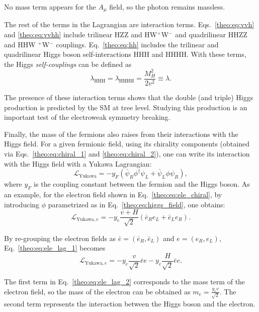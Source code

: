 \documentclass[../main.tex]{subfiles}
\begin{document}
No mass term appears for the $A_\mu$ field, so the photon remains massless.

The rest of the terms in the Lagrangian are interaction terms. Eqs.~\eqref{theo:eq:vvh} and \eqref{theo:eq:vvhh} include trilinear HZZ and HW${}^+$W${}^-$ and quadrilinear HHZZ and HHW
${}^+$W${}^-$ couplings. Eq.~\eqref{theo:eq:hh} includes the trilinear and quadrilinear Higgs boson self-interactions HHH and HHHH. With these terms, the Higgs \textit{self-couplings} can be defined as
\begin{equation}
\lambda_{\text{HHH}} = \lambda_{\text{HHHH}} = \frac{M_H^2}{2v^2} \equiv \lambda.
\end{equation}

The presence of these interaction terms shows that the double (and triple) Higgs production is predicted by the SM at tree level. Studying this production is an important test of the electroweak symmetry breaking.

Finally, the mass of the fermions also raises from their interactions with the Higgs field. For a given fermionic field, using its chirality components (obtained via Eqs.~\eqref{theo:eq:chiral_1} and \eqref{theo:eq:chiral_2}), one can write its interaction with the Higgs field with a Yukawa Lagrangian:
\begin{equation}
\mathcal{L}_{\text{Yukawa}} = -y_F(\bar{\psi}_R\phi^\dagger\psi_L + \bar{\psi}_L\phi\psi_R),
\end{equation}
where $y_F$ is the coupling constant between the fermion and the Higgs boson. As an example, for the electron field shown in Eq.~\eqref{theo:eq:ele_chiral}, by introducing $\phi$ parametrized as in Eq.~\eqref{theo:eq:higgs_field}, one obtains:
\begin{equation}
\label{theo:eq:ele_lag_1}
\mathcal{L}_{\text{Yukawa}, e} = -y_e \frac{v + H}{\sqrt{2}}(\bar{e}_R e_L + \bar{e}_L e_R).
\end{equation}

By re-grouping the electron fields as $\bar{e} = (\bar{e}_R,\bar{e}_L)$ and $e = (e_R, e_L)$, Eq.~\eqref{theo:eq:ele_lag_1} becomes
\begin{equation}
\label{theo:eq:ele_lag_2}
\mathcal{L}_{\text{Yukawa}, e} = -y_e \frac{v}{\sqrt{2}} \bar{e}e -y_e \frac{H}{\sqrt{2}} \bar{e}e.
\end{equation}

The first term in Eq.~\eqref{theo:eq:ele_lag_2} corresponds to the mass term of the electron field, so the mass of the electron can be obtained as $m_e = \frac{y_e v}{\sqrt{2}}$. The second term represents the interaction between the Higgs boson and the electron.
\end{document}
